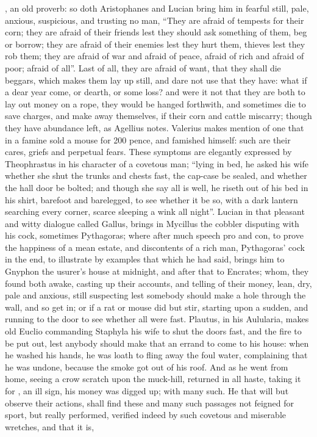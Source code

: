, an old proverb: so doth
Aristophanes and Lucian bring him in fearful still, pale, anxious, suspicious,
and trusting no man, \enquote{They are afraid of tempests for
their corn; they are afraid of their friends lest they should ask something of
them, beg or borrow; they are afraid of their enemies lest they hurt them,
thieves lest they rob them; they are afraid of war and afraid of peace, afraid
of rich and afraid of poor; afraid of all}. Last of all, they are afraid of
want, that they shall die beggars, which makes them lay up still, and dare not
use that they have: what if a dear year come, or dearth, or some loss? and were
it not that they are both to lay out money on a rope, they
would be hanged forthwith, and sometimes die to save charges, and make away
themselves, if their corn and cattle miscarry; though they have abundance left,
as Agellius notes. Valerius makes
mention of one that in a famine sold a mouse for 200 pence, and famished
himself: such are their cares, griefs and perpetual fears.
These symptoms are elegantly expressed by Theophrastus in his character of a
covetous man; \enquote{lying in bed, he asked his wife whether she
shut the trunks and chests fast, the cap-case be sealed, and whether the hall
door be bolted; and though she say all is well, he riseth out of his bed in his
shirt, barefoot and barelegged, to see whether it be so, with a dark lantern
searching every corner, scarce sleeping a wink all night}. Lucian in that
pleasant and witty dialogue called Gallus, brings in Mycillus the cobbler
disputing with his cock, sometimes Pythagoras; where after much speech pro and
con, to prove the happiness of a mean estate, and discontents of a rich man,
Pythagoras' cock in the end, to illustrate by examples that which he had said,
brings him to Gnyphon the usurer's house at midnight, and after that to
Encrates; whom, they found both awake, casting up their accounts, and telling
of their money, lean, dry, pale and anxious, still
suspecting lest somebody should make a hole through the wall, and so get in; or
if a rat or mouse did but stir, starting upon a sudden, and running to the door
to see whether all were fast. Plautus, in his Aulularia, makes old Euclio
commanding Staphyla his wife to shut the doors fast, and
the fire to be put out, lest anybody should make that an errand to come to his
house: when he washed his hands, he was loath to fling
away the foul water, complaining that he was undone, because the smoke got out
of his roof. And as he went from home, seeing a crow scratch upon the
muck-hill, returned in all haste, taking it for , an ill sign,
his money was digged up; with many such. He that will but observe their
actions, shall find these and many such passages not feigned for sport, but
really performed, verified indeed by such covetous and miserable wretches, and
that it is,


